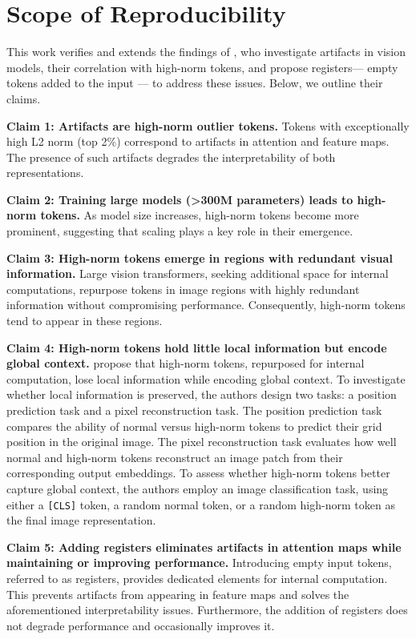 \documentclass[10pt]{article} \usepackage[preprint]{tmlr}
\begin{document}
\section{Scope of Reproducibility}
\label{sec:scope}
This work verifies and extends the findings of \citet{darcet2024registers}, who investigate artifacts in vision models, their correlation with high-norm tokens, and propose registers— empty tokens added to the input — to address these issues. Below, we outline their claims.

\textbf{Claim 1: Artifacts are high-norm outlier tokens.}  
Tokens with exceptionally high L2 norm (top 2\%) correspond to artifacts in attention and feature maps. The presence of such artifacts degrades the interpretability of both representations.

\textbf{Claim 2: Training large models (>300M parameters) leads to high-norm tokens.}  
As model size increases, high-norm tokens become more prominent, suggesting that scaling plays a key role in their emergence.

\textbf{Claim 3: High-norm tokens emerge in regions with redundant visual information.}
Large vision transformers, seeking additional space for internal computations, repurpose tokens in image regions with highly redundant information without compromising performance. Consequently, high-norm tokens tend to appear in these regions.

\textbf{Claim 4: High-norm tokens hold little local information but encode global context.}  
\citet{darcet2024registers} propose that high-norm tokens, repurposed for internal computation, lose local information while encoding global context. To investigate whether local information is preserved, the authors design two tasks: a position prediction task and a pixel reconstruction task. The position prediction task compares the ability of normal versus high-norm tokens to predict their grid position in the original image. The pixel reconstruction task evaluates how well normal and high-norm tokens reconstruct an image patch from their corresponding output embeddings. To assess whether high-norm tokens better capture global context, the authors employ an image classification task, using either a \texttt{[CLS]} token, a random normal token, or a random high-norm token as the final image representation.

\textbf{Claim 5: Adding registers eliminates artifacts in attention maps while maintaining or improving performance.}  
Introducing empty input tokens, referred to as registers, provides dedicated elements for internal computation. This prevents artifacts from appearing in feature maps and solves the aforementioned interpretability issues. Furthermore, the addition of registers does not degrade performance and occasionally improves it.
\end{document}
